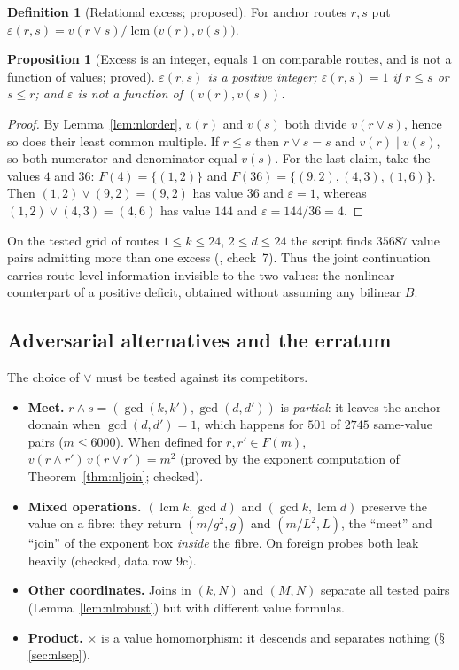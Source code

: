 \documentclass[11pt,a4paper]{article}
\renewcommand{\S}{\ensuremath{\mathsection}}
\newcommand{\lcm}{\operatorname{lcm}}
\newcommand{\vj}{\mathbin{\vee}}
\theoremstyle{plain}
\newtheorem{proposition}[theorem]{Proposition}
\theoremstyle{definition}
\newtheorem{definition}[theorem]{Definition}
\begin{document}
\begin{definition}[Relational excess; proposed]\label{def:nlexcess}
For anchor routes $r,s$ put $\varepsilon(r,s)=v(r\vj s)/\lcm\bigl(v(r),v(s)\bigr)$.
\end{definition}
\begin{proposition}[Excess is an integer, equals $1$ on comparable routes, and is not a function of values; proved]\label{prop:nlexcess}
$\varepsilon(r,s)$ is a positive integer; $\varepsilon(r,s)=1$ if $r\le s$ or $s\le r$; and $\varepsilon$ is not a function of $(v(r),v(s))$.
\end{proposition}
\begin{proof}
By Lemma~\ref{lem:nlorder}, $v(r)$ and $v(s)$ both divide $v(r\vj s)$, hence so does their least common multiple. If $r\le s$ then $r\vj s=s$ and $v(r)\mid v(s)$, so both numerator and denominator equal $v(s)$. For the last claim, take the values $4$ and $36$: $F(4)=\{(1,2)\}$ and $F(36)=\{(9,2),(4,3),(1,6)\}$. Then $(1,2)\vj(9,2)=(9,2)$ has value $36$ and $\varepsilon=1$, whereas $(1,2)\vj(4,3)=(4,6)$ has value $144$ and $\varepsilon=144/36=4$.
\end{proof}
\noindent On the tested grid of routes $1\le k\le24$, $2\le d\le24$ the script finds $35687$ value pairs admitting more than one excess (, check~7). Thus the joint continuation carries route-level information invisible to the two values: the nonlinear counterpart of a positive deficit, obtained without assuming any bilinear $B$.

\subsection{Adversarial alternatives and the erratum}\label{sec:nlalt}
The choice of $\vj$ must be tested against its competitors.
\begin{itemize}
\item \textbf{Meet.} $r\wedge s=(\gcd(k,k'),\gcd(d,d'))$ is \emph{partial}: it leaves the anchor domain when $\gcd(d,d')=1$, which happens for $501$ of $2745$ same-value pairs ($m\le6000$). When defined for $r,r'\in F(m)$, $v(r\wedge r')\,v(r\vj r')=m^2$ (proved by the exponent computation of Theorem~\ref{thm:nljoin}; checked).
\item \textbf{Mixed operations.} $(\lcm k,\gcd d)$ and $(\gcd k,\lcm d)$ preserve the value on a fibre: they return $(m/g^2,g)$ and $(m/L^2,L)$, the ``meet'' and ``join'' of the exponent box \emph{inside} the fibre. On foreign probes both leak heavily (checked, data row 9c).
\item \textbf{Other coordinates.} Joins in $(k,N)$ and $(M,N)$ separate all tested pairs (Lemma~\ref{lem:nlrobust}) but with different value formulas.
\item \textbf{Product.} $\times$ is a value homomorphism: it descends and separates nothing (\S\ref{sec:nlsep}).
\end{itemize}
\end{document}
